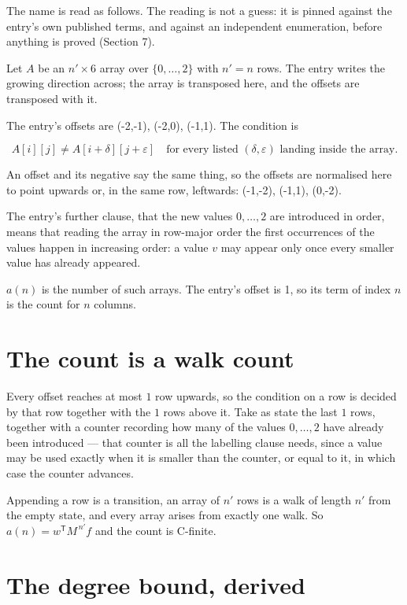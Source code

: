 \documentclass[11pt]{article}
\theoremstyle{definition}
\begin{document}
The name is read as follows. The reading is not a guess: it is pinned against the entry's own published terms, and against an independent enumeration, before anything is proved (Section 7).

Let $A$ be an $n' \times 6$ array over $\{0,\dots,2\}$ with $n' = n$ rows. The entry writes the growing direction across; the array is transposed here, and the offsets are transposed with it.

The entry's offsets are (-2,-1), (-2,0), (-1,1). The condition is

\[A[i][j] \ne A[i{+}\delta][j{+}\varepsilon]\quad\text{for every listed }(\delta,\varepsilon)\text{ landing inside the array.}\]

An offset and its negative say the same thing, so the offsets are normalised here to point upwards or, in the same row, leftwards: (-1,-2), (-1,1), (0,-2).

The entry's further clause, that the new values $0,\dots,2$ are introduced in order, means that reading the array in row-major order the first occurrences of the values happen in increasing order: a value $v$ may appear only once every smaller value has already appeared.

$a(n)$ is the number of such arrays. The entry's offset is 1, so its term of index $n$ is the count for $n$ columns.

\section{The count is a walk count}

Every offset reaches at most $1$ row upwards, so the condition on a row is decided by that row together with the $1$ rows above it. Take as state the last $1$ rows, together with a counter recording how many of the values $0,\dots,2$ have already been introduced --- that counter is all the labelling clause needs, since a value may be used exactly when it is smaller than the counter, or equal to it, in which case the counter advances.

Appending a row is a transition, an array of $n'$ rows is a walk of length $n'$ from the empty state, and every array arises from exactly one walk. So $a(n) = w^{\mathsf T}M^{\,n'}f$ and the count is C-finite.

\section{The degree bound, derived}
\end{document}
